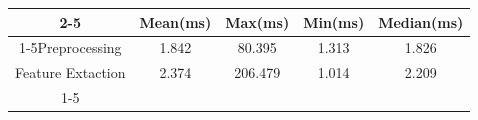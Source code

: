 \documentclass{standalone}
\begin{document}
 
 \begin{tabular}{|c |c |c |c |c |}
\cline{2-5}\cline{2-5} \multicolumn{1}{c |}{ } & Mean(ms) & Max(ms) & Min(ms) & Median(ms)\\ 
\cline{1-5}Preprocessing & 1.842 & 80.395 & 1.313 & 1.826\\ 
 \hhline{|=|=|=|=|=|}Feature Extaction & 2.374 & 206.479 & 1.014 & 2.209\\ 
 \cline{1-5}\hline \end{tabular}
 
\end{document}
